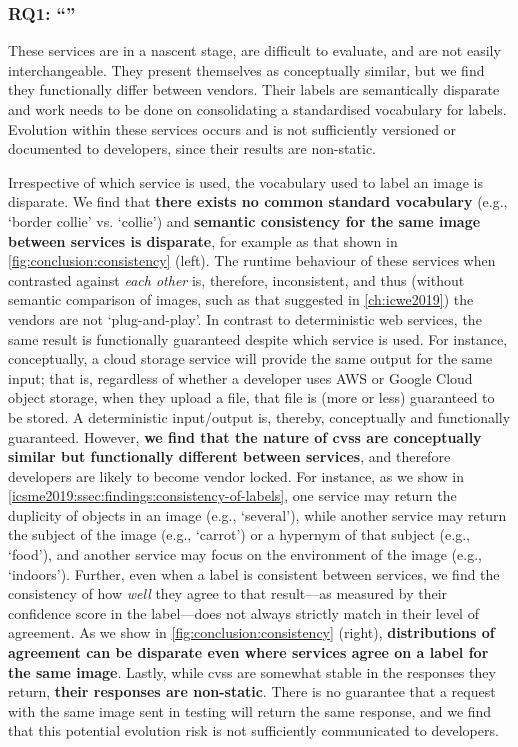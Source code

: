 \subsubsection*{RQ1: ``\RQOneTextLandscapeAnalysis{}''}
\begin{callout}
These services are in a nascent stage, are difficult to evaluate, and are not easily interchangeable. They present themselves as conceptually similar, but we find they functionally differ between vendors. Their labels are semantically disparate and work needs to be done on consolidating a standardised vocabulary for labels. Evolution within these services occurs and is not sufficiently versioned or documented to developers, since their results are non-static.
\end{callout}

Irrespective of which service is used, the vocabulary used to label an image is disparate. We find that \textbf{there exists no common standard vocabulary} (e.g., `border collie' vs. `collie') and \textbf{semantic consistency for the same image between services is disparate}, for example as that shown in \cref{fig:conclusion:consistency} (left). The runtime behaviour of these services when contrasted against \textit{each other} is, therefore, inconsistent, and thus (without semantic comparison of images, such as that suggested in \cref{ch:icwe2019}) the vendors are not `plug-and-play'. In contrast to deterministic web services, the same result is functionally guaranteed despite which service is used. For instance, conceptually, a cloud storage service will provide the same output for the same input; that is, regardless of whether a developer uses AWS or Google Cloud object storage, when they upload a file, that file is (more or less) guaranteed to be stored. A deterministic input/output is, thereby, conceptually and functionally guaranteed. However, \textbf{we find that the nature of \glspl{cvs} are conceptually similar but functionally different between services}, and therefore developers are likely to become vendor locked. For instance, as we show in \cref{icsme2019:ssec:findings:consistency-of-labels}, one service may return the duplicity of objects in an image (e.g., `several'), while another service may return the subject of the image (e.g., `carrot') or a hypernym of that subject (e.g., `food'), and another service may focus on the environment of the image (e.g., `indoors').
Further, even when a label is consistent between services, we find the consistency of how \textit{well} they agree to that result---as measured by their confidence score in the label---does not always strictly match in their level of agreement. As we show in \cref{fig:conclusion:consistency} (right), \textbf{distributions of agreement can be disparate even where services agree on a label for the same image}.
Lastly, while \glspl{cvs} are somewhat stable in the responses they return, \textbf{their responses are non-static}. There is no guarantee that a request with the same image sent in testing will return the same response, and we find that this potential evolution risk is not sufficiently communicated to developers.


